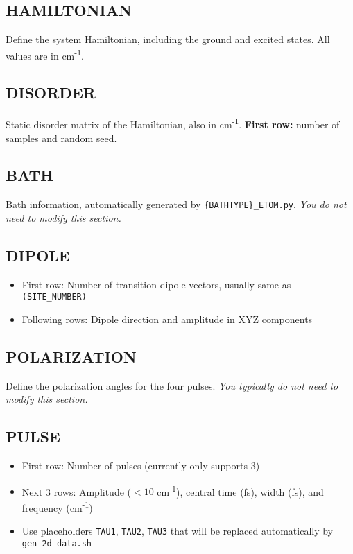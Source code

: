 \documentclass{article}
\begin{document}
\subsection*{HAMILTONIAN}
Define the system Hamiltonian, including the ground and excited states. All values are in cm\textsuperscript{-1}.

\subsection*{DISORDER}
Static disorder matrix of the Hamiltonian, also in cm\textsuperscript{-1}.  
\textbf{First row:} number of samples and random seed.

\subsection*{BATH}
Bath information, automatically generated by \texttt{\{BATHTYPE\}\_ETOM.py}.  
\textit{You do not need to modify this section.}

\subsection*{DIPOLE}
\begin{itemize}
    \item First row: Number of transition dipole vectors, usually same as \texttt{(SITE\_NUMBER)}
    \item Following rows: Dipole direction and amplitude in XYZ components
\end{itemize}

\subsection*{POLARIZATION}
Define the polarization angles for the four pulses.  
\textit{You typically do not need to modify this section.}

\subsection*{PULSE}
\begin{itemize}
    \item First row: Number of pulses (currently only supports 3)
    \item Next 3 rows: Amplitude (\(< 10\) cm\textsuperscript{-1}), central time (fs), width (fs), and frequency (cm\textsuperscript{-1})
    \item Use placeholders \texttt{TAU1}, \texttt{TAU2}, \texttt{TAU3} that will be replaced automatically by \texttt{gen\_2d\_data.sh}
\end{itemize}
\end{document}
